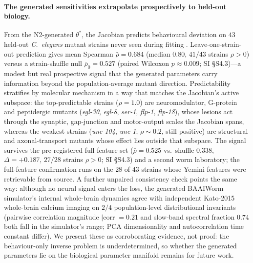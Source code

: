 \documentclass[11pt]{article}
\begin{document}
\paragraph{The generated sensitivities extrapolate prospectively to held-out biology.} From the N2-generated $\theta^{*}$, the Jacobian predicts behavioural deviation on $43$ held-out \emph{C.~elegans} mutant strains never seen during fitting \citep{yemini2013openworm}. Leave-one-strain-out prediction gives mean Spearman $\bar\rho{=}0.684$ (median $0.80$, $41/43$ strains $\rho{>}0$) versus a strain-shuffle null $\bar\rho_0{=}0.527$ (paired Wilcoxon $p{\approx}0.009$; SI \S S4.3)---a modest but real prospective signal that the generated parameters carry information beyond the population-average mutant direction. Predictability stratifies by molecular mechanism in a way that matches the Jacobian's active subspace: the top-predictable strains ($\rho{=}1.0$) are neuromodulator, G-protein and peptidergic mutants (\emph{egl-30}, \emph{egl-8}, \emph{ser-1}, \emph{flp-1}, \emph{flp-18}), whose lesions act through the synaptic, gap-junction and motor-output scales the Jacobian spans, whereas the weakest strains (\emph{unc-104}, \emph{unc-1}; $\rho{\sim}0.2$, still positive) are structural and axonal-transport mutants whose effect lies outside that subspace. The signal survives the pre-registered full feature set ($\bar\rho{=}0.525$ vs.\ shuffle $0.338$, $\Delta{=}{+}0.187$, $27/28$ strains $\rho{>}0$; SI \S S4.3) and a second worm laboratory; the full-feature confirmation runs on the $28$ of $43$ strains whose Yemini features were retrievable from source. A further unpaired consistency check points the same way: although no neural signal enters the loss, the generated BAAIWorm simulator's internal whole-brain dynamics agree with independent Kato-2015 whole-brain calcium imaging \citep{kato2015global} on $2/4$ population-level distributional invariants (pairwise correlation magnitude $|\mathrm{corr}|{=}0.21$ and slow-band spectral fraction $0.74$ both fall in the simulator's range; PCA dimensionality and autocorrelation time constant differ). We present these as corroborating evidence, not proof: the behaviour-only inverse problem is underdetermined, so whether the generated parameters lie on the biological parameter manifold remains for future work.
\end{document}
